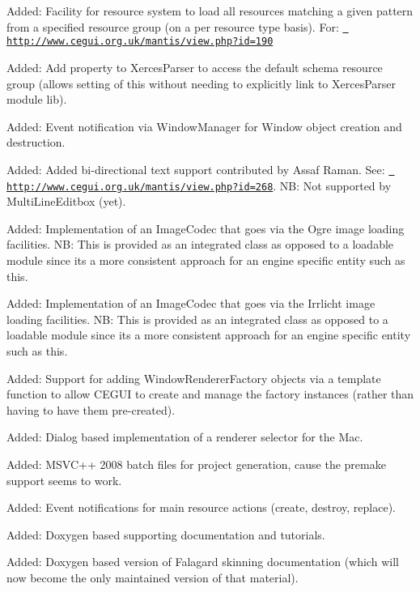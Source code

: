 \begin{DoxyItemize}
\item Added\+: Facility for resource system to load all resources matching a given pattern from a specified resource group (on a per resource type basis). For\+: \href{http://www.cegui.org.uk/mantis/view.php?id=190}{\texttt{ http\+://www.\+cegui.\+org.\+uk/mantis/view.\+php?id=190}}
\item Added\+: Add property to Xerces\+Parser to access the default schema resource group (allows setting of this without needing to explicitly link to Xerces\+Parser module lib).
\item Added\+: Event notification via Window\+Manager for Window object creation and destruction.
\item Added\+: Added bi-\/directional text support contributed by Assaf Raman. See\+: \href{http://www.cegui.org.uk/mantis/view.php?id=268}{\texttt{ http\+://www.\+cegui.\+org.\+uk/mantis/view.\+php?id=268}}. NB\+: Not supported by Multi\+Line\+Editbox (yet).
\item Added\+: Implementation of an Image\+Codec that goes via the Ogre image loading facilities. NB\+: This is provided as an \textquotesingle{}integrated\textquotesingle{} class as opposed to a loadable module since it\textquotesingle{}s a more consistent approach for an engine specific entity such as this.
\item Added\+: Implementation of an Image\+Codec that goes via the Irrlicht image loading facilities. NB\+: This is provided as an \textquotesingle{}integrated\textquotesingle{} class as opposed to a loadable module since it\textquotesingle{}s a more consistent approach for an engine specific entity such as this.
\item Added\+: Support for adding Window\+Renderer\+Factory objects via a template function to allow C\+E\+G\+UI to create and manage the factory instances (rather than having to have them pre-\/created).
\item Added\+: Dialog based implementation of a renderer selector for the Mac.
\item Added\+: M\+S\+V\+C++ 2008 batch files for project generation, cause the premake support seems to work.
\item Added\+: Event notifications for main resource actions (create, destroy, replace).
\item Added\+: Doxygen based supporting documentation and tutorials.
\item Added\+: Doxygen based version of Falagard skinning documentation (which will now become the only maintained version of that material).

\end{DoxyItemize}
